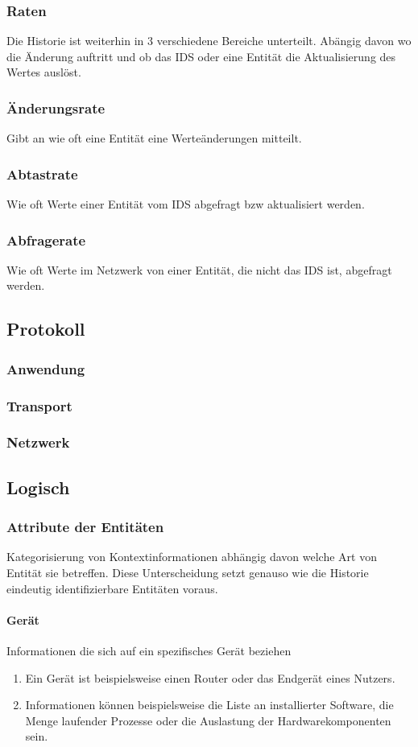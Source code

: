 \subsubsection{Raten}
Die Historie ist weiterhin in 3 verschiedene Bereiche unterteilt. Abängig davon wo die Änderung auftritt und ob das IDS oder eine Entität die Aktualisierung des Wertes auslöst.
\subsubsection{Änderungsrate} 
Gibt an wie oft eine Entität eine Werteänderungen mitteilt.
\subsubsection{Abtastrate}
Wie oft Werte einer Entität vom IDS abgefragt bzw aktualisiert werden.
\subsubsection{Abfragerate}
Wie oft Werte im Netzwerk von einer Entität, die nicht das IDS ist, abgefragt werden.
\subsection{Protokoll}
\subsubsection{Anwendung}
\subsubsection{Transport}
\subsubsection{Netzwerk}

\subsection{Logisch}
\subsubsection{Attribute der Entitäten}
Kategorisierung von Kontextinformationen abhängig davon welche Art von Entität sie betreffen.
Diese Unterscheidung setzt genauso wie die Historie eindeutig identifizierbare Entitäten voraus.
\paragraph{Gerät}
Informationen die sich auf ein spezifisches Gerät beziehen
\begin{enumerate}
\item{Ein Gerät ist beispielsweise einen Router oder das Endgerät eines Nutzers. }
\item{Informationen können beispielsweise die Liste an installierter Software, die Menge laufender Prozesse oder die Auslastung der Hardwarekomponenten sein.}
\end{enumerate}
